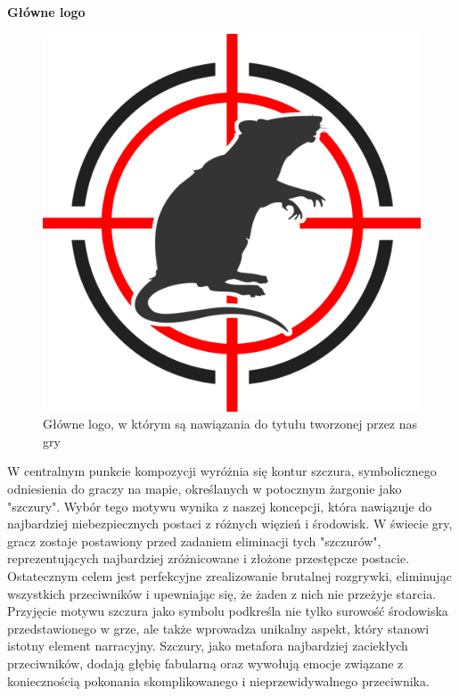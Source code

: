 \begin{center}
{\bfseries Główne logo}
\end{center}
\begin{figure}[h]
    \centering
    \includegraphics[scale=15]{Images/logo.png}
    \caption{Główne logo, w którym są nawiązania do tytułu tworzonej przez nas gry}
\end{figure}
\FloatBarrier

W centralnym punkcie kompozycji wyróżnia się kontur szczura, symbolicznego odniesienia do graczy na mapie, określanych w potocznym żargonie jako "szczury". Wybór tego motywu wynika z naszej koncepcji, która nawiązuje do najbardziej niebezpiecznych postaci z różnych więzień i środowisk. W świecie gry, gracz zostaje postawiony przed zadaniem eliminacji tych "szczurów", reprezentujących najbardziej zróżnicowane i złożone przestępcze postacie. Ostatecznym celem jest perfekcyjne zrealizowanie brutalnej rozgrywki, eliminując wszystkich przeciwników i upewniając się, że żaden z nich nie przeżyje starcia.
Przyjęcie motywu szczura jako symbolu podkreśla nie tylko surowość środowiska przedstawionego w grze, ale także wprowadza unikalny aspekt, który stanowi istotny element narracyjny. Szczury, jako metafora najbardziej zaciekłych przeciwników, dodają głębię fabularną oraz wywołują emocje związane z koniecznością pokonania skomplikowanego i nieprzewidywalnego przeciwnika.

